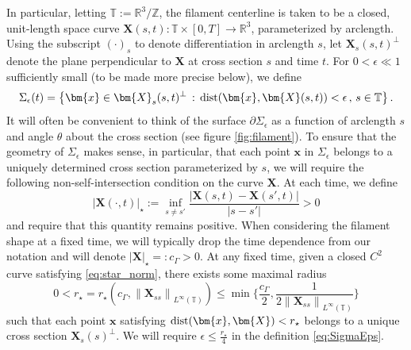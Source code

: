 \documentclass[11pt,reqno]{amsart}
\newcommand{\R}{\mathbb{R}}
\newcommand{\Z}{\mathbb{Z}}
\newcommand{\T}{\mathbb{T}}
\newcommand{\bx}{\bm{x}}
\newcommand{\X}{\bm{X}}
\newcommand{\p}{\partial}
\newcommand{\abs}[1]{\left\lvert #1 \right\rvert}
\newcommand{\norm}[1]{\left\lVert #1 \right\rVert}
\theoremstyle{definition}
\begin{document}
In particular, letting $\T:=\R^3/\Z$, the filament centerline is taken to be a closed, unit-length space curve $\X(s,t):\T\times[0,T]\to \R^3$, parameterized by arclength. Using the subscript $(\cdot)_s$ to denote differentiation in arclength $s$, let $\X_s(s,t)^\perp$ denote the plane perpendicular to $\X$ at cross section $s$ and time $t$.  
For $0<\epsilon\ll1$ sufficiently small (to be made more precise below), we define
\begin{equation}\label{eq:SigmaEps}
  \Sigma_\epsilon(t) = \big\{ \bx\in \X_s(s,t)^\perp\,:\, {\rm dist}(\bx,\X(s,t))<\epsilon\,, \, s\in \T \big\}\,.
\end{equation}
It will often be convenient to think of the surface $\p\Sigma_\epsilon$ as a function of arclength $s$ and angle $\theta$ about the cross section (see figure \ref{fig:filament}). 
To ensure that the geometry of $\Sigma_\epsilon$ makes sense, in particular, that each point $\bx$ in $\Sigma_\epsilon$ belongs to a uniquely determined cross section parameterized by $s$, we will require the following non-self-intersection condition on the curve $\X$. At each time, we define 
\begin{equation}\label{eq:star_norm}
\abs{\X(\cdot,t)}_\star := \inf_{s\neq s'} \frac{\abs{\X(s,t)-\X(s',t)}}{\abs{s-s'}} >0
\end{equation}
and require that this quantity remains positive. When considering the filament shape at a fixed time, we will typically drop the time dependence from our notation and will denote $\abs{\X}_\star=:c_\Gamma>0$. At any fixed time, given a closed $C^2$ curve satisfying \eqref{eq:star_norm}, there exists some maximal radius
\begin{equation}\label{eq:rstar}
  0<r_\star = r_\star(c_\Gamma,\norm{\X_{ss}}_{L^\infty(\T)}) \le \min\bigg\{\frac{c_\Gamma}{2}, \frac{1}{2\norm{\X_{ss}}_{L^\infty(\T)}}\bigg\}
\end{equation}
such that each point $\bx$ satisfying ${\rm dist}(\bx,\X)<r_\star$ belongs to a unique cross section $\X_s(s)^\perp$. We will require $\epsilon\le \frac{r_\star}{4}$ in the definition \eqref{eq:SigmaEps}. 
\end{document}
